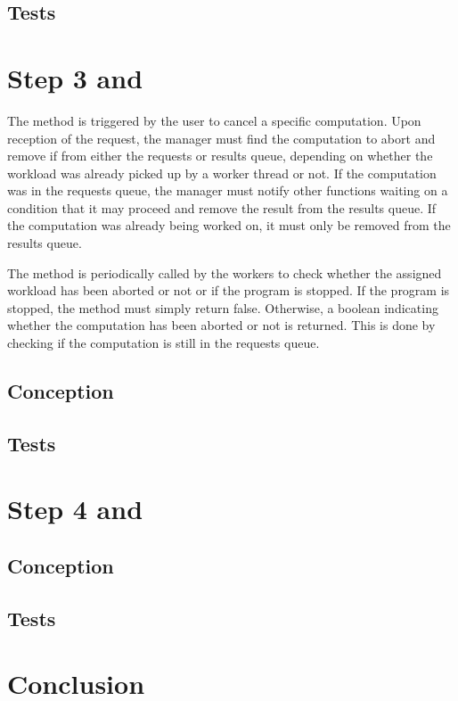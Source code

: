 \documentclass{article}
\begin{document}
    \subsection{Tests}


    \section{Step 3  and }

    The  method is triggered by the user to cancel a specific computation.
    Upon reception of the request, the manager must find the computation to abort and remove if from either the requests or results queue, depending
    on whether the workload was already picked up by a worker thread or not.
    If the computation was in the requests queue, the manager must notify other functions waiting on a  condition that it may proceed and remove the result from the results queue.
    If the computation was already being worked on, it must only be removed from the results queue.

    The  method is periodically called by the workers to check whether the assigned workload has been aborted or not or if the program is stopped.
    If the program is stopped, the method must simply return false.
    Otherwise, a boolean indicating whether the computation has been aborted or not is returned.
    This is done by checking if the computation is still in the requests queue.

    \subsection{Conception}
    \subsection{Tests}


    \section{Step 4  and }
    \subsection{Conception}
    \subsection{Tests}

    \section{Conclusion}
\end{document}
